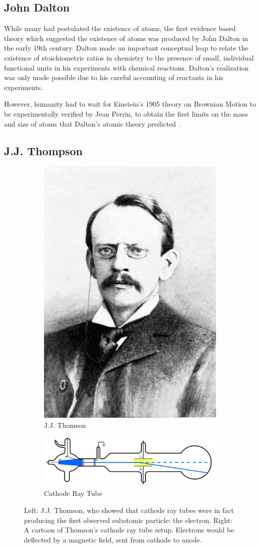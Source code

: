 \subsection{John Dalton}

While many had postulated the existence of atoms, the first evidence based
theory which suggested the existence of atoms was produced by John Dalton in the
early 19th century. Dalton made an important conceptual leap to relate the
existence of stoichiometric ratios in chemistry to the presence of small,
individual functional units in his experiments with chemical reactions.
Dalton's realization was only made possible due to his careful accounting of
reactants in his experiments.

However, humanity had to wait for Einstein's 1905 theory on Brownian Motion to
be experimentally verified by Jean Perrin, to obtain the first  limits on the
mass and size of atoms that Dalton's atomic theory
predicted~\cite{Patterson200750}.

\subsection{J.J. Thompson}

\begin{figure}[ht]
	\centering
	\begin{subfigure}{.4\textwidth}
		\centering
		\includegraphics[width=0.4\linewidth]{./figures/jjthomson.png}
		\caption{J.J. Thomson  \cite{PopularScience1899}}
		\label{fig:thomsonportrait}
	\end{subfigure}%
	\begin{subfigure}{0.6\textwidth}
		\centering
		\includegraphics[width=0.4\linewidth]{./figures/cathoderaytube.png}
		\caption{Cathode Ray Tube  \cite{Kurzon2010}}
		\label{fig:thomsoncathode}
	\end{subfigure}
	\caption{ 
		Left: J.J. Thomson, who showed that cathode ray tubes were in fact producing
		the first observed subatomic particle: the electron. Right: A cartoon of
		Thomson's cathode ray tube setup. Electrons would be deflected by a magnetic
		field, sent from cathode to anode.
	}
	\label{fig:jjthomson}
\end{figure}

